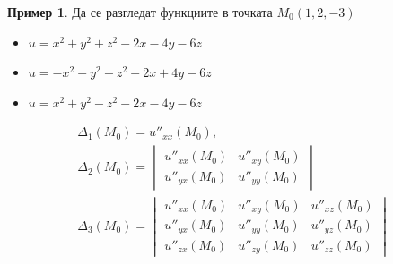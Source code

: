 \documentclass[a4paper,fleqn,12pt]{article}
\theoremstyle{definition}
\newtheorem{example}{Пример}[subsection]
\begin{document}
\begin{example}
Да се разгледат функциите в точката $M_0 (1,2,-3)$
\begin{itemize}
\item $u = x^2 + y^2 + z^2 - 2x - 4y - 6z$ 
\item $u = -x^2 - y^2 - z^2 + 2x + 4y - 6z$ 
\item $u = x^2 + y^2 - z^2 - 2x - 4y - 6z$ 
\end{itemize}

\begin{gather*}
\Delta_1 (M_0) = u''_{xx}(M_0), \\
\Delta_2 (M_0) = 
\begin{vmatrix}
u''_{xx}(M_0) &  u''_{xy}(M_0) \\ 
u''_{yx}(M_0) &  u''_{yy}(M_0) 
\end{vmatrix}\\
\Delta_3 (M_0) = 
\begin{vmatrix}
u''_{xx}(M_0) &  u''_{xy}(M_0)  & u''_{xz}(M_0)\\ 
u''_{yx}(M_0) &  u''_{yy}(M_0)  & u''_{yz}(M_0) \\
u''_{zx}(M_0) &  u''_{zy}(M_0)  & u''_{zz}(M_0)
\end{vmatrix}
\end{gather*}


\end{example}
\end{document}
